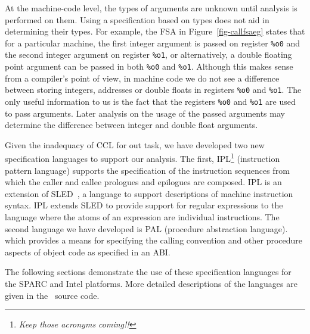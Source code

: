 At the machine-code level, the types of arguments are unknown until
analysis is performed on them.  Using a specification based on types
does not aid in determining their types.  For example, the FSA in
Figure~\ref{fig-callfsaeg} states that for a particular machine, the
first integer argument is passed on register \texttt{\%o0} and the
second integer argument on register \texttt{\%o1}, or alternatively,
a double floating point argument can be passed in both \texttt{\%o0}
and \texttt{\%o1}.  Although this makes sense from a compiler's point
of view, in machine code we do not see a difference between storing
integers, addresses or double floats in registers \texttt{\%o0}
and \texttt{\%o1}.  The only useful information to us is the fact
that the registers \texttt{\%o0} and \texttt{\%o1} are used to pass
arguments.  Later analysis on the usage of the passed arguments may
determine the difference between integer and double float arguments.

\centerfigbegin
{}

Given the inadequacy of CCL for out task, we have developed two
new specification languages to support our analysis. The first,
IPL\footnote{\it Keep those acronyms coming!!} (instruction
pattern language) supports the specification of the instruction
sequences from which the caller and callee prologues and epilogues
are composed. IPL is an extension of SLED~\cite{Rams94b}, a language
to support descriptions of machine instruction syntax. IPL extends
SLED to provide support for regular expressions to the language where
the atoms of an expression are individual instructions. The second
language we have developed is PAL (procedure abstraction language).
which provides a means for specifying the calling convention and
other procedure aspects of object code as specified in an ABI.

The following sections demonstrate the use of these
specification languages for the SPARC and Intel platforms. More
detailed descriptions of the languages are given in the \uqbt\ 
source code. 


